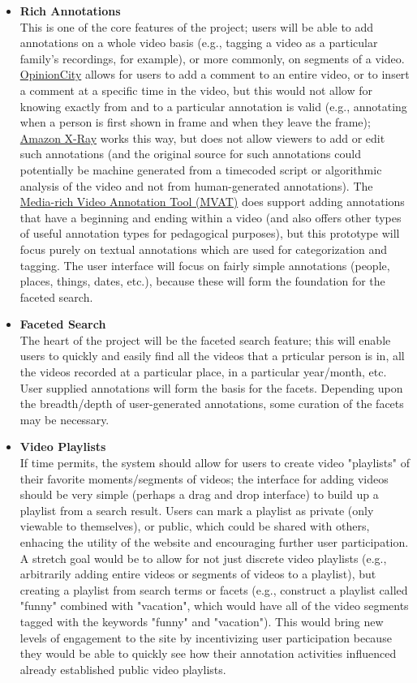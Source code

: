 \begin{itemize}[leftmargin=*]
\item \textbf{Rich Annotations} \\
	This is one of the core features of the project; users will be able to add annotations on a whole video basis (e.g., tagging a video as a particular family's recordings, for example), or more commonly, on segments of a video. \hyperref[sec:priorwork:opinioncity]{OpinionCity} allows for users to add a comment to an entire video, or to insert a comment at a specific time in the video, but this would not allow for knowing exactly from and to a particular annotation is valid (e.g., annotating when a person is first shown in frame and when they leave the frame); \hyperref[sec:priorwork:amazon-x-ray]{Amazon X-Ray} works this way, but does not allow viewers to add or edit such annotations (and the original source for such annotations could potentially be machine generated from a timecoded script or algorithmic analysis of the video and not from human-generated annotations).  The \hyperref[sec:priorwork:media-rich-video-annotation-tool]{Media-rich Video Annotation Tool (MVAT)} does support adding annotations that have a beginning and ending within a video (and also offers other types of useful annotation types for pedagogical purposes), but this prototype will focus purely on textual annotations which are used for categorization and tagging.  The user interface will focus on fairly simple annotations (people, places, things, dates, etc.), because these will form the foundation for the faceted search.
	
\item \textbf{Faceted Search} \\
	The heart of the project will be the faceted search feature; this will enable users to quickly and easily find all the videos that a prticular person is in, all the videos recorded at a particular place, in a particular year/month, etc.  User supplied annotations will form the basis for the facets.  Depending upon the breadth/depth of user-generated annotations, some curation of the facets may be necessary.

\item \textbf{Video Playlists} \\
	If time permits, the system should allow for users to create video "playlists" of their favorite moments/segments of videos; the interface for adding videos should be very simple (perhaps a drag and drop interface) to build up a playlist from a search result.  Users can mark a playlist as private (only viewable to themselves), or public, which could be shared with others, enhacing the utility of the website and encouraging further user participation.  A stretch goal would be to allow for not just discrete video playlists (e.g., arbitrarily adding entire videos or segments of videos to a playlist), but creating a playlist from search terms or facets (e.g., construct a playlist called "funny" combined with "vacation", which would have all of the video segments tagged with the keywords "funny" and "vacation").  This would bring new levels of engagement to the site by incentivizing user participation because they would be able to quickly see how their annotation activities influenced already established public video playlists.


\end{itemize}
